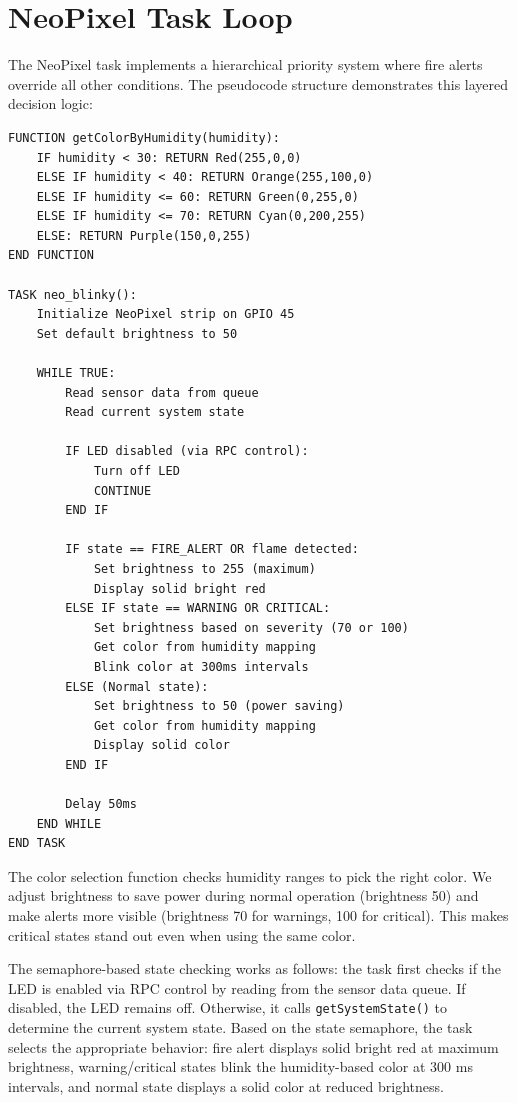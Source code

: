 \section{NeoPixel Task Loop}

The NeoPixel task implements a hierarchical priority system where fire alerts override all other conditions. The pseudocode structure demonstrates this layered decision logic:

\begin{verbatim}
FUNCTION getColorByHumidity(humidity):
    IF humidity < 30: RETURN Red(255,0,0)
    ELSE IF humidity < 40: RETURN Orange(255,100,0)
    ELSE IF humidity <= 60: RETURN Green(0,255,0)
    ELSE IF humidity <= 70: RETURN Cyan(0,200,255)
    ELSE: RETURN Purple(150,0,255)
END FUNCTION

TASK neo_blinky():
    Initialize NeoPixel strip on GPIO 45
    Set default brightness to 50
    
    WHILE TRUE:
        Read sensor data from queue
        Read current system state
        
        IF LED disabled (via RPC control):
            Turn off LED
            CONTINUE
        END IF
        
        IF state == FIRE_ALERT OR flame detected:
            Set brightness to 255 (maximum)
            Display solid bright red
        ELSE IF state == WARNING OR CRITICAL:
            Set brightness based on severity (70 or 100)
            Get color from humidity mapping
            Blink color at 300ms intervals
        ELSE (Normal state):
            Set brightness to 50 (power saving)
            Get color from humidity mapping
            Display solid color
        END IF
        
        Delay 50ms
    END WHILE
END TASK
\end{verbatim}

The color selection function checks humidity ranges to pick the right color. We adjust brightness to save power during normal operation (brightness 50) and make alerts more visible (brightness 70 for warnings, 100 for critical). This makes critical states stand out even when using the same color.

The semaphore-based state checking works as follows: the task first checks if the LED is enabled via RPC control by reading from the sensor data queue. If disabled, the LED remains off. Otherwise, it calls \texttt{getSystemState()} to determine the current system state. Based on the state semaphore, the task selects the appropriate behavior: fire alert displays solid bright red at maximum brightness, warning/critical states blink the humidity-based color at 300 ms intervals, and normal state displays a solid color at reduced brightness.

